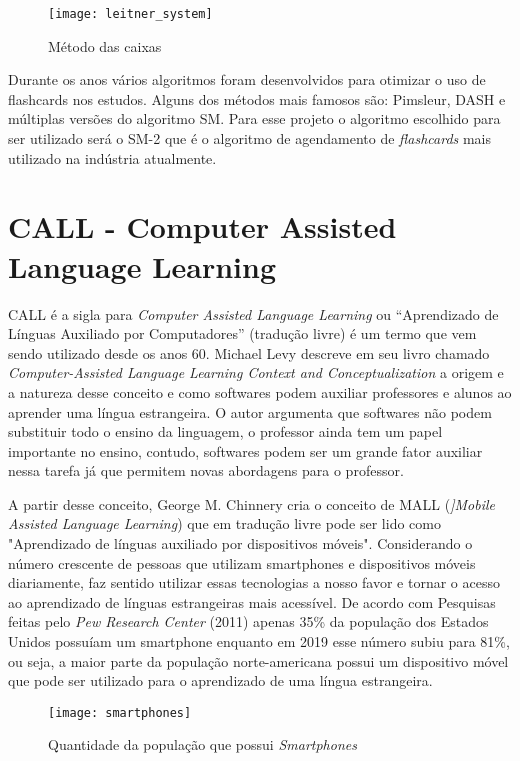 \begin{figure}[H]
	\caption{\label{fig:leitner_system}Método das caixas}
	\begin{center}
		\texttt{[image: leitner\_system]}
	\end{center}
\end{figure}


Durante os anos vários algoritmos foram desenvolvidos para otimizar o uso de flashcards nos estudos. Alguns dos métodos mais famosos são: Pimsleur, DASH e múltiplas versões do algoritmo SM. Para esse projeto o algoritmo escolhido para ser utilizado será o SM-2 que é o algoritmo de agendamento de \textit{flashcards} mais utilizado na indústria atualmente.

\section{CALL - Computer Assisted Language Learning}
CALL é a sigla para \textit{Computer Assisted Language Learning} ou “Aprendizado de Línguas Auxiliado por Computadores” (tradução livre) é um termo que vem sendo utilizado desde os anos 60. Michael Levy descreve em seu livro chamado \textit{Computer-Assisted Language Learning Context and Conceptualization} a origem e a natureza desse conceito e como softwares podem auxiliar professores e alunos ao aprender uma língua estrangeira. O autor argumenta que softwares não podem substituir todo o ensino da linguagem, o professor ainda tem um papel importante no ensino, contudo, softwares podem ser um grande fator auxiliar nessa tarefa já que permitem novas abordagens para o professor.

A partir desse conceito, George M. Chinnery cria o conceito de MALL (\textit{]Mobile Assisted Language Learning}) que em tradução livre pode ser lido como "Aprendizado de línguas auxiliado por dispositivos móveis". Considerando o número crescente de pessoas que utilizam smartphones e dispositivos móveis diariamente, faz sentido utilizar essas tecnologias a nosso favor e tornar o acesso ao aprendizado de línguas estrangeiras mais acessível. De acordo com Pesquisas feitas pelo \textit{Pew Research Center} (2011) apenas 35\% da população dos Estados Unidos possuíam um smartphone enquanto em 2019 esse número subiu para 81\%, ou seja, a maior parte da população norte-americana possui um dispositivo móvel que pode ser utilizado para o aprendizado de uma língua estrangeira.

\begin{figure}[H]
	\caption{\label{fig:smartphones}Quantidade da população que possui \textit{Smartphones}}
	\begin{center}
		\texttt{[image: smartphones]}
	\end{center}
\end{figure}

